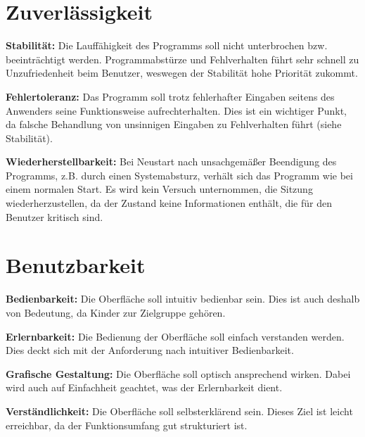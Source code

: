 \documentclass[10pt]{scrreprt}
\newcommand{\sfbf}[1]{\textbf{\sffamily #1}}
\newenvironment{details}[1][6pt]{%
  \parskip#1 \parindent6mm \raggedright%
  \def\item{\par\ignorespaces\hangindent=5mm \hangafter1}}{%
  \par\ignorespaces}
\begin{document}
\section*{Zuverlässigkeit}
\begin{details}
\item \sfbf{Stabilität:} Die Lauffähigkeit des Programms soll nicht unterbrochen bzw. beeinträchtigt werden. Programmabstürze und Fehlverhalten führt sehr schnell zu Unzufriedenheit beim Benutzer, weswegen der Stabilität hohe Priorität zukommt.

\item \sfbf{Fehlertoleranz:} Das Programm soll trotz fehlerhafter Eingaben seitens des Anwenders seine Funktionsweise aufrechterhalten. Dies ist ein wichtiger Punkt, da falsche Behandlung von unsinnigen Eingaben zu Fehlverhalten führt (siehe Stabilität).

\item \sfbf{Wiederherstellbarkeit:} Bei Neustart nach unsachgemäßer Beendigung des Programms, z.B. durch einen Systemabsturz, verhält sich das Programm wie bei einem normalen Start. Es wird kein Versuch unternommen, die Sitzung wiederherzustellen, da der Zustand keine Informationen enthält, die für den Benutzer kritisch sind.
\end{details}


\section*{Benutzbarkeit}
\begin{details}
\item \sfbf{Bedienbarkeit:} Die Oberfläche soll intuitiv bedienbar sein. Dies ist auch deshalb von Bedeutung, da Kinder zur Zielgruppe gehören.

\item \sfbf{Erlernbarkeit:} Die Bedienung der Oberfläche soll einfach verstanden werden. Dies deckt sich mit der Anforderung nach intuitiver Bedienbarkeit.

\item \sfbf{Grafische Gestaltung:} Die Oberfläche soll optisch ansprechend wirken. Dabei wird auch auf Einfachheit geachtet, was der Erlernbarkeit dient.

\item \sfbf{Verständlichkeit:} Die Oberfläche soll selbsterklärend sein. Dieses Ziel ist leicht erreichbar, da der Funktionsumfang gut strukturiert ist.
\end{details}
\end{document}
